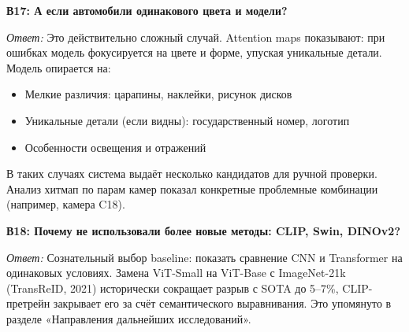 \documentclass[a4paper, 12pt]{article}
\begin{document}
\vspace{1em}
\textbf{В17: А если автомобили одинакового цвета и модели?}

\textit{Ответ:} Это действительно сложный случай. Attention maps показывают: при ошибках модель фокусируется на цвете и форме, упуская уникальные детали. Модель опирается на:
\begin{itemize}
  \item Мелкие различия: царапины, наклейки, рисунок дисков
  \item Уникальные детали (если видны): государственный номер, логотип
  \item Особенности освещения и отражений
\end{itemize}
В таких случаях система выдаёт несколько кандидатов для ручной проверки. Анализ хитмап по парам камер показал конкретные проблемные комбинации (например, камера C18).

\vspace{1em}
\textbf{В18: Почему не использовали более новые методы: CLIP, Swin, DINOv2?}

\textit{Ответ:} Сознательный выбор baseline: показать сравнение CNN и Transformer на одинаковых условиях. Замена ViT-Small на ViT-Base с ImageNet-21k (TransReID, 2021) исторически сокращает разрыв с SOTA до 5--7\%, CLIP-претрейн закрывает его за счёт семантического выравнивания. Это упомянуто в разделе «Направления дальнейших исследований».
\end{document}

